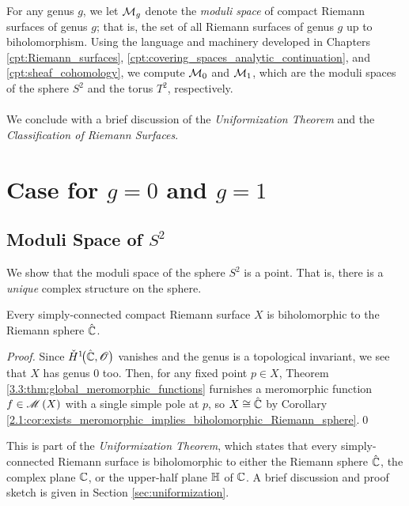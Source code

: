 \documentclass[../Moduli_Spaces_of_Riemann_Surfaces.tex]{subfiles}
\begin{document}
    For any genus $g$, we let $\mathcal{M}_g$ denote the \textit{moduli space} of compact Riemann surfaces of genus $g$; that is, the set of all Riemann surfaces of genus $g$ up to biholomorphism. Using the language and machinery developed in Chapters \ref{cpt:Riemann_surfaces}, \ref{cpt:covering_spaces_analytic_continuation}, and \ref{cpt:sheaf_cohomology}, we compute $\mathcal{M}_0$ and $\mathcal{M}_1$, which are the moduli spaces of the sphere $S^2$ and the torus $T^2$, respectively.\\\ \\
    We conclude with a brief discussion of the \textit{Uniformization Theorem} and the \textit{Classification of Riemann Surfaces}.
    \section{Case for $g=0$ and $g=1$}
    \subsection{Moduli Space of $S^2$}\label{sec:moduli_space_of_sphere}
    We show that the moduli space of the sphere $S^2$ is a point. That is, there is a \textit{unique} complex structure on the sphere.
    \begin{theorem}\label{4.1:thm:simply-connect_compact_biholomorphic_Riemann_sphere}
        Every simply-connected compact Riemann surface $X$ is biholomorphic to the Riemann sphere $\hat{\mathbb{C}}$.
    \end{theorem}
    \begin{proof}
        Since $\check{H}^1\!\big(\hat{\mathbb{C}},\mathscr{O}\big)$ vanishes and the genus is a topological invariant, we see that $X$ has genus $0$ too. Then, for any fixed point $p\in X$, Theorem \ref{3.3:thm:global_meromorphic_functions} furnishes a meromorphic function $f\in\mathscr{M}\left(X\right)$ with a single simple pole at $p$, so $X\cong\hat{\mathbb{C}}$ by Corollary \ref{2.1:cor:exists_meromorphic_implies_biholomorphic_Riemann_sphere}.\qed
    \end{proof}
    \begin{remark}
        This is part of the \textit{Uniformization Theorem}, which states that every simply-connected Riemann surface is biholomorphic to either the Riemann sphere $\hat{\mathbb{C}}$, the complex plane $\mathbb{C}$, or the upper-half plane $\mathbb{H}$ of $\mathbb{C}$. A brief discussion and proof sketch is given in Section \ref{sec:uniformization}.\exqed
    \end{remark}
\end{document}
